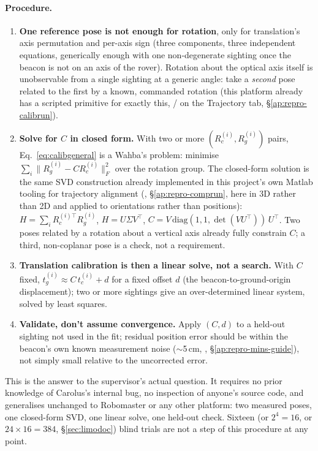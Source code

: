 \paragraph{Procedure.}
\begin{enumerate}[leftmargin=1.4em]
\item \textbf{One reference pose is not enough for rotation}, only for
  translation's axis permutation and per-axis sign (three components, three
  independent equations, generically enough with one non-degenerate sighting
  once the beacon is not on an axis of the rover). Rotation about the
  optical axis itself is unobservable from a single sighting at a generic
  angle: take a \emph{second} pose related to the first by a known,
  commanded rotation (this platform already has a scripted primitive for
  exactly this, / on the
  Trajectory tab, \S\ref{ap:repro-calibrun}).
\item \textbf{Solve for $C$ in closed form.} With two or more
  $(R_c^{(i)}, R_g^{(i)})$ pairs, Eq.~\ref{eq:calibgeneral} is a Wahba's
  problem: minimise $\sum_i \lVert R_g^{(i)} - C R_c^{(i)} \rVert_F^2$ over
  the rotation group. The closed-form solution is the same SVD construction
  already implemented in this project's own Matlab tooling for trajectory
  alignment (, \S\ref{ap:repro-comprun}, here in 3D
  rather than 2D and applied to orientations rather than positions):
  $H=\sum_i R_c^{(i)\top} R_g^{(i)}$, $H=U\Sigma V^\top$,
  $C = V\,\mathrm{diag}(1,1,\det(VU^\top))\,U^\top$. Two poses related by a
  rotation about a vertical axis already fully constrain $C$; a third,
  non-coplanar pose is a check, not a requirement.
\item \textbf{Translation calibration is then a linear solve, not a search.}
  With $C$ fixed, $t_g^{(i)} \approx C\,t_c^{(i)} + d$ for a fixed offset
  $d$ (the beacon-to-ground-origin displacement); two or more sightings give
  an over-determined linear system, solved by least squares.
\item \textbf{Validate, don't assume convergence.} Apply $(C,d)$ to a
  held-out sighting not used in the fit; residual position error should be
  within the beacon's own known measurement noise
  ($\sim$5\,cm, , \S\ref{ap:repro-mins-guide}), not
  simply small relative to the uncorrected error.
\end{enumerate}
This is the answer to the supervisor's actual question. It requires no prior
knowledge of Carolus's internal bug, no inspection of anyone's source code,
and generalises unchanged to Robomaster or any other platform: two measured
poses, one closed-form SVD, one linear solve, one held-out check. Sixteen (or
$2^4=16$, or $24\times16=384$, \S\ref{sec:limodoc}) blind trials are not a
step of this procedure at any point.

